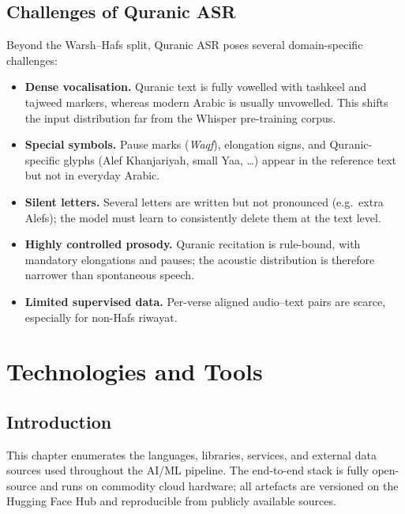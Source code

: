 \documentclass[12pt,a4paper]{report}
\begin{document}
\section{Challenges of Quranic ASR}
\label{sec:mt_quran_asr_challenges}

Beyond the Warsh--Hafs split, Quranic ASR poses several domain-specific
challenges:

\begin{itemize}
  \item \textbf{Dense vocalisation.} Quranic text is fully vowelled with
        tashkeel and tajweed markers, whereas modern Arabic is usually
        unvowelled. This shifts the input distribution far from the
        Whisper pre-training corpus.
  \item \textbf{Special symbols.} Pause marks (\textit{Waqf}), elongation
        signs, and Quranic-specific glyphs (Alef Khanjariyah, small Yaa,
        \dots) appear in the reference text but not in everyday Arabic.
  \item \textbf{Silent letters.} Several letters are written but not
        pronounced (e.g.\ extra Alefs); the model must learn to
        consistently delete them at the text level.
  \item \textbf{Highly controlled prosody.} Quranic recitation is rule-bound,
        with mandatory elongations and pauses; the acoustic distribution
        is therefore narrower than spontaneous speech.
  \item \textbf{Limited supervised data.} Per-verse aligned audio--text
        pairs are scarce, especially for non-Hafs riwayat.
\end{itemize}

\chapter{Technologies and Tools}
\label{ch:mt_tech}

\section{Introduction}
This chapter enumerates the languages, libraries, services, and external
data sources used throughout the AI/ML pipeline. The end-to-end stack is
fully open-source and runs on commodity cloud hardware; all artefacts are
versioned on the Hugging Face Hub and reproducible from publicly available
sources.
\end{document}
